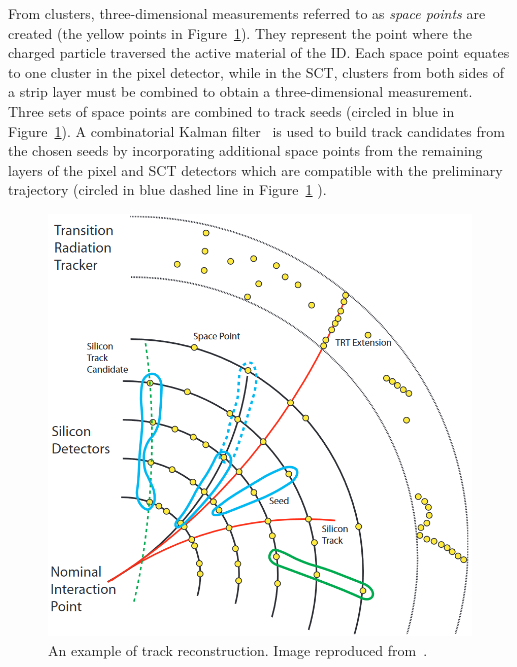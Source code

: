 From clusters, three-dimensional measurements referred to as
\textit{space points} are created (the yellow points in Figure~\ref{fig:track_recon}). 
They represent the point where the charged particle 
traversed the active material of the ID. 
Each space point equates to one cluster in the pixel detector, while in the SCT, 
clusters from both sides of a strip layer must be combined to obtain a three-dimensional measurement.
Three sets of space points are combined to track seeds 
(circled in blue in Figure~\ref{fig:track_recon}). 
A combinatorial Kalman filter~\cite{FRUHWIRTH1987444} is used to 
build track candidates from the chosen seeds by incorporating additional 
space points from the remaining layers of the pixel and SCT detectors which 
are compatible with the preliminary trajectory 
(circled in blue dashed line in Figure~\ref{fig:track_recon} ). 
\begin{figure}[bht]
    \begin{centering}	
    \includegraphics[width=.8\textwidth]{Reconstruction/plots/track.png}
    \caption{An example of track reconstruction. Image reproduced from~\cite{ATLAS-CONF-2010-072}.
        }
    \label{fig:track_recon}
    \end{centering}
\end{figure}

